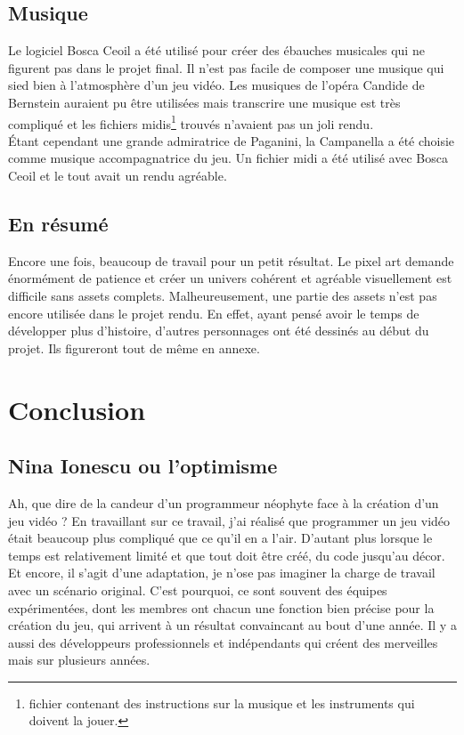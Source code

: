 \documentclass[11pt]{article}
\begin{document}
\subsection{Musique}
Le logiciel Bosca Ceoil a été utilisé pour créer des ébauches musicales qui ne figurent pas dans le projet final. Il n'est pas facile de composer une musique qui sied bien à l'atmosphère d'un jeu vidéo. Les musiques de l'opéra Candide de Bernstein auraient pu être utilisées mais transcrire une musique est très compliqué et les fichiers midis\footnote{fichier contenant des instructions sur la musique et les instruments qui doivent la jouer.} trouvés n'avaient pas un joli rendu.\\

Étant cependant une grande admiratrice de Paganini, la Campanella a été choisie comme musique accompagnatrice du jeu. Un fichier midi a été utilisé avec Bosca Ceoil et le tout avait un rendu agréable.  
\subsection{En résumé}
Encore une fois, beaucoup de travail pour un petit résultat. Le pixel art demande énormément de patience et créer un univers cohérent et agréable visuellement est difficile sans assets complets. Malheureusement, une partie des assets n'est pas encore utilisée dans le projet rendu. En effet, ayant pensé avoir le temps de développer plus d'histoire, d'autres personnages ont été dessinés au début du projet. Ils figureront tout de même en annexe.
\section{Conclusion}
\subsection{Nina Ionescu ou l'optimisme} 
Ah, que dire de la candeur d'un programmeur néophyte face à la création d'un jeu vidéo ? En travaillant sur ce travail, j'ai réalisé que programmer un jeu vidéo était beaucoup plus compliqué que ce qu'il en a l'air. D'autant plus lorsque le temps est relativement limité et que tout doit être créé, du code jusqu'au décor. Et encore, il s'agit d'une adaptation, je n'ose pas imaginer la charge de travail avec un scénario original. C'est pourquoi, ce sont souvent des équipes expérimentées, dont les membres ont chacun une fonction bien précise pour la création du jeu, qui arrivent à un résultat convaincant au bout d'une année. Il y a aussi des développeurs professionnels et indépendants qui créent des merveilles mais sur plusieurs années. \\
\end{document}

